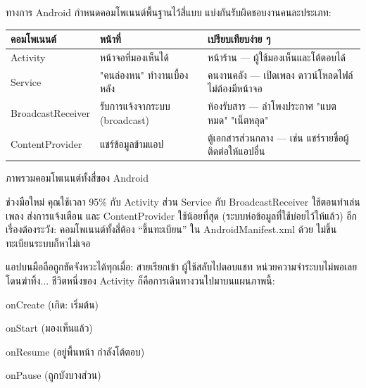 


ทางการ Android กำหนดคอมโพเนนต์พื้นฐานไว้สี่แบบ แบ่งกันรับผิดชอบงานคนละประเภท:

\begin{center}
\begin{tabularx}{\linewidth}{|X|X|X|}
\hline
\textbf{คอมโพเนนต์} & \textbf{หน้าที่} & \textbf{เปรียบเทียบง่าย ๆ} \tabularnewline
\hline
Activity & หน้าจอที่มองเห็นได้ & หน้าร้าน — ผู้ใช้มองเห็นและโต้ตอบได้ \tabularnewline
Service & "คนล่องหน" ทำงานเบื้องหลัง & คนงานคลัง — เปิดเพลง ดาวน์โหลดไฟล์ ไม่ต้องมีหน้าจอ \tabularnewline
BroadcastReceiver & รับการแจ้งจากระบบ (broadcast) & ห้องรับสาร — ลำโพงประกาศ "แบตหมด" "เน็ตหลุด" \tabularnewline
ContentProvider & แชร์ข้อมูลข้ามแอป & ตู้เอกสารส่วนกลาง — เช่น แชร์รายชื่อผู้ติดต่อให้แอปอื่น \tabularnewline
\hline
\end{tabularx}
\end{center}

\begin{center}\small\color{gray}ภาพรวมคอมโพเนนต์ทั้งสี่ของ Android\end{center}

ช่วงมือใหม่ คุณใช้เวลา 95\% กับ Activity ส่วน Service กับ BroadcastReceiver ใช้ตอนทำเล่นเพลง ส่งการแจ้งเตือน และ ContentProvider ใช้น้อยที่สุด (ระบบห่อข้อมูลที่ใช้บ่อยไว้ให้แล้ว) อีกเรื่องต้องระวัง: คอมโพเนนต์ทั้งสี่ต้อง “ขึ้นทะเบียน” ใน AndroidManifest.xml ด้วย ไม่ขึ้นทะเบียนระบบก็หาไม่เจอ


แอปบนมือถือถูกขัดจังหวะได้ทุกเมื่อ: สายเรียกเข้า ผู้ใช้สลับไปตอบแชท หน่วยความจำระบบไม่พอเลยโดนฆ่าทิ้ง... ชีวิตหนึ่งของ Activity ก็คือการเดินทางวนไปมาบนแผนภาพนี้:

onCreate (เกิด: เริ่มต้น)

onStart (มองเห็นแล้ว)

onResume (อยู่พื้นหน้า กำลังโต้ตอบ)

onPause (ถูกบังบางส่วน)

